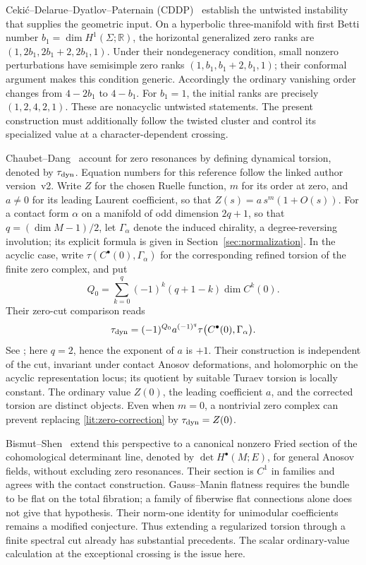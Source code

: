 \documentclass[11pt,letterpaper,reqno]{amsart}
\theoremstyle{remark}
\begin{document}
Ceki\'c--Delarue--Dyatlov--Paternain (CDDP)~\cite{CDDP} establish the
untwisted instability that supplies the geometric input. On a
hyperbolic three-manifold with first Betti number
$b_1=\dim H^1(\Sigma;\mathbb R)$, the horizontal
generalized zero ranks are $(1,2b_1,2b_1+2,2b_1,1)$. Under their
nondegeneracy condition, small nonzero perturbations have semisimple
zero ranks $(1,b_1,b_1+2,b_1,1)$; their conformal argument makes this
condition generic. Accordingly the ordinary vanishing order changes
from $4-2b_1$ to $4-b_1$. For $b_1=1$, the initial ranks are precisely
$(1,2,4,2,1)$. These are nonacyclic untwisted statements. The present
construction must additionally follow the twisted cluster and control
its specialized value at a character-dependent crossing.

Chaubet--Dang~\cite{CD} account for zero resonances by defining
dynamical torsion, denoted by $\tau_{\rm dyn}$. Equation numbers for
this reference follow the linked author version~v2. Write $Z$ for the
chosen Ruelle function, $m$ for its order at zero, and $a\ne0$ for
its leading Laurent coefficient,
so that $Z(s)=a\,s^m(1+O(s))$. For a contact form $\alpha$ on a
manifold of odd dimension $2q+1$, so that $q=(\dim M-1)/2$, let
$\Gamma_\alpha$ denote the induced
chirality, a degree-reversing involution; its explicit formula is given
in Section~\ref{sec:normalization}. In the acyclic case, write
$\tau(C^\bullet(0),\Gamma_\alpha)$ for the corresponding refined torsion
of the finite zero complex, and put
\[
 Q_0=\sum_{k=0}^{q}(-1)^k(q+1-k)\dim C^k(0).
\]
Their zero-cut comparison reads
\begin{equation}\label{lit:zero-correction}
 \tau_{\rm dyn}
   =(-1)^{Q_0}a^{(-1)^q}
        \tau\bigl(C^\bullet(0),\Gamma_\alpha\bigr).
\end{equation}
See \cite[(6.7)]{CD}; here $q=2$, hence the exponent of $a$ is $+1$.
Their construction is independent of the cut, invariant under contact
Anosov deformations, and holomorphic on the acyclic representation
locus; its quotient by suitable Turaev torsion is locally constant.
The ordinary value $Z(0)$, the leading coefficient $a$, and the
corrected torsion are distinct objects. Even when $m=0$, a nontrivial
zero complex can prevent replacing \eqref{lit:zero-correction} by
$\tau_{\rm dyn}=Z(0)$.

Bismut--Shen~\cite{BS} extend this perspective to a canonical
nonzero Fried section of the cohomological determinant line,
denoted by $\det H^\bullet(M;E)$, for general Anosov
fields, without excluding zero resonances. Their section is $C^1$ in
families and agrees with the contact construction. Gauss--Manin
flatness requires the bundle to be flat on the total fibration; a
family of fiberwise flat connections alone does not give that
hypothesis. Their norm-one identity for unimodular coefficients remains a modified conjecture.
Thus extending a regularized torsion through a finite spectral cut
already has substantial precedents. The scalar ordinary-value
calculation at the exceptional crossing is the issue here.
\end{document}
